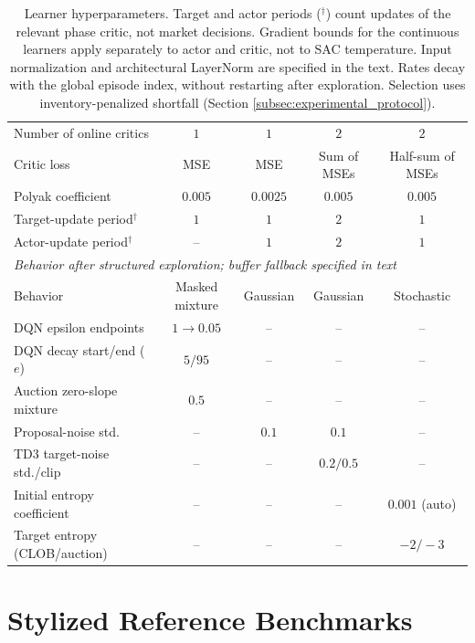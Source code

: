 \documentclass[11pt]{article}
\begin{document}
\begin{table}[ht!]
\begin{tabular}{lcccc}
\midrule
Number of online critics & $1$ & $1$ & $2$ & $2$ \\
Critic loss & MSE & MSE & Sum of MSEs & Half-sum of MSEs \\
Polyak coefficient & $0.005$ & $0.0025$ & $0.005$ & $0.005$ \\
Target-update period$^\dagger$ & $1$ & $1$ & $2$ & $1$ \\
Actor-update period$^\dagger$ & -- & $1$ & $2$ & $1$ \\
\midrule
\multicolumn{5}{l}{\emph{Behavior after structured exploration; buffer fallback specified in text}}\\
Behavior & Masked mixture & Gaussian & Gaussian & Stochastic \\
DQN epsilon endpoints & $1\to0.05$ & -- & -- & -- \\
DQN decay start/end ($e$) & $5/95$ & -- & -- & -- \\
Auction zero-slope mixture & $0.5$ & -- & -- & -- \\
Proposal-noise std. & -- & $0.1$ & $0.1$ & -- \\
TD3 target-noise std./clip & -- & -- & $0.2/0.5$ & -- \\
Initial entropy coefficient & -- & -- & -- & $0.001$ (auto) \\
Target entropy (CLOB/auction) & -- & -- & -- & $-2/-3$ \\
\bottomrule
\end{tabular}
\caption{Learner hyperparameters. Target and actor periods ($^\dagger$) count updates of the relevant phase critic, not market decisions. Gradient bounds for the continuous learners apply separately to actor and critic, not to SAC temperature. Input normalization and architectural LayerNorm are specified in the text. Rates decay with the global episode index, without restarting after exploration. Selection uses inventory-penalized shortfall (Section \ref{subsec:experimental_protocol}).}
\label{tab:hyperparams}
\end{table}
\endgroup

\section{Stylized Reference Benchmarks}
\label{sec:benchmark}
\end{document}
